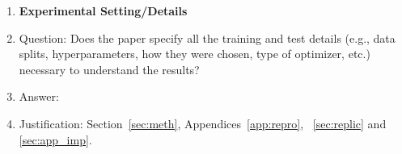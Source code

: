\begin{enumerate}
\item {\bf Experimental Setting/Details}
    \item[] Question: Does the paper specify all the training and test details (e.g., data splits, hyperparameters, how they were chosen, type of optimizer, etc.) necessary to understand the results?
    \item[] Answer: \answerYes{} %
    \item[] Justification: Section~\ref{sec:meth}, Appendices~\ref{app:repro}, ~\ref{sec:replic} and \ref{sec:app_imp}.


\end{enumerate}
